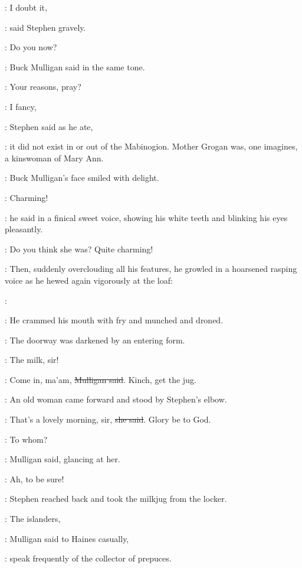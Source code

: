 \Stephen:
I doubt it,

:
said Stephen gravely.

\Mulligan:
Do you now?

:
Buck Mulligan said in the same tone.

\Mulligan:
Your reasons, pray?

\Stephen:
I fancy,

:
Stephen said as he ate,

\Stephen:
it did not exist in or out of the Mabinogion.
Mother Grogan was, one imagines, a kinswoman of Mary Ann.

:
Buck Mulligan's face smiled with delight.

\Mulligan:
Charming!

:
he said in a finical sweet voice,
showing his white teeth and blinking his eyes pleasantly.

\Mulligan:
Do you think she was?
Quite charming!

:
Then, suddenly overclouding all his features,
he growled in a hoarsened rasping voice
as he hewed again vigorously at the loaf:

\Mulligan:
\begin{verse}
\end{verse}

:
He crammed his mouth with fry and munched and droned.

:
The doorway was darkened by an entering form.

\OldWoman:
The milk, sir!

\Mulligan:
Come in, ma'am,
\sout{Mulligan said}.
Kinch, get the jug.

:
An old woman came forward and stood by Stephen's elbow.

\OldWoman:
That's a lovely morning, sir,
\sout{she said}.
Glory be to God.

\Mulligan:
To whom?

:
Mulligan said, glancing at her.

\Mulligan:
Ah, to be sure!

:
Stephen reached back and took the milkjug from the locker.

\Mulligan:
The islanders,

:
Mulligan said to Haines casually,

\Mulligan:
speak frequently of the collector of prepuces.


